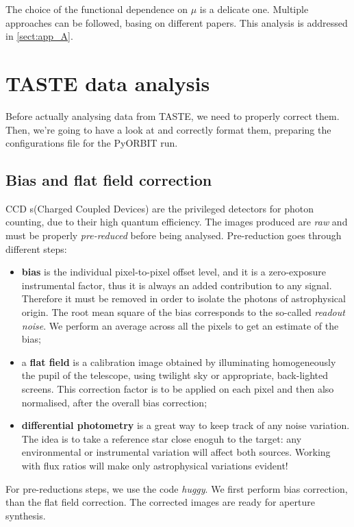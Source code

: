 \documentclass[a4paper,11pt,twocolumn]{article}
\begin{document}
The choice of the functional dependence on $\mu$ is a delicate one. Multiple 
approaches can be followed, basing on different papers. This analysis is 
addressed in \ref{sect:app_A}.


\section{TASTE data analysis}

Before actually analysing data from TASTE, we need to properly correct them.
Then, we're going to have a look at and correctly format them, preparing 
the configurations file for the PyORBIT run. 


\subsection{Bias and flat field correction}
CCD s(Charged Coupled Devices) are the privileged detectors for photon counting, 
due to their high quantum efficiency. The images produced are \textit{raw}
and must be properly \textit{pre-reduced} before being analysed. Pre-reduction 
goes through different steps:
\begin{itemize}
    \item \textbf{bias} is the
    individual pixel-to-pixel offset level, and it is a zero-exposure instrumental 
    factor, thus it is always an added contribution to any signal. Therefore it must 
    be removed in order to isolate the photons of astrophysical origin. The root mean square 
    of the bias corresponds to the so-called \textit{readout noise}. We perform an 
    average across all the pixels to get an estimate of the bias;
    \item a \textbf{flat field} is a calibration image obtained by illuminating
    homogeneously the pupil of the telescope, using twilight sky or appropriate, 
    back-lighted screens. This correction factor is to be applied on each pixel and 
    then also normalised, after the overall bias correction;
    \item \textbf{differential photometry} is a great way to keep track of any noise
    variation. The idea is to take a reference star close enoguh to the target: any 
    environmental or instrumental variation will affect both sources. Working with 
    flux ratios will make only astrophysical variations evident!
\end{itemize}
For pre-reductions steps, we use the code \textit{huggy}. We first perform bias
correction, than the flat field correction. The corrected images are ready for 
aperture synthesis.
\end{document}

